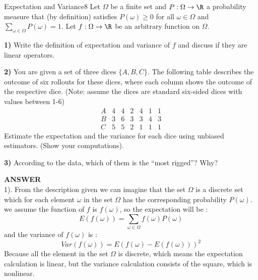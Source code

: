 \newif\ifvimbug
\vimbugfalse

\ifvimbug

\fi

 

\begin{questions}


\begin{question}{Expectation and Variance}{8}
Let $\Omega$ be a finite set and $P:\Omega\rightarrow\R$ a probability measure that (by definition) satisfies $P(\omega)\geq0$ for all $\omega\in\Omega$ and $\sum_{\omega\in\Omega}P(\omega)=1$. 
Let $f:\Omega\rightarrow\R$ be an arbitrary function on $\Omega$.

\textbf{1)} Write the definition of expectation and variance of $f$ and discuss if they are linear operators.

\textbf{2)} You are given a set of three dices $\{A,B,C\}$.
The following table describes the outcome of six rollouts for these dices, where each column shows the outcome of the respective dice. 
(Note: assume the dices are standard six-sided dices with values between 1-6)
\begin{equation*}
\begin{array}{r|cccccc}
    A & 4 & 4 & 2 & 4 & 1 & 1 \\
    \hline
    B & 3 & 6 & 3 & 3 & 4 & 3 \\
    \hline
    C & 5 & 5 & 2 & 1 & 1 & 1 
\end{array}
\end{equation*}
Estimate the expectation and the variance for each dice using unbiased estimators. (Show your computations).

\textbf{3)} According to the data, which of them is the ``most rigged''? Why?

\begin{answer}
\textbf{ANSWER}\\

1). 
From the description given we can imagine that the set $\Omega$ is a discrete set which for each element $\omega$ in the set $\Omega$ has the corresponding probability $P(\omega)$. we assume the function of $f$ is $f(\omega)$, so the expectation will be :
$$E(f(\omega)) = \sum_{\omega \in \Omega}f(\omega)P(\omega)$$
and the variance of $f(\omega)$ is :
$$Var(f(\omega)) = E(f(\omega)- E(f(\omega)))^2$$
Because all the element in the set $\Omega$ is discrete, which means the expectation calculation is linear, but the variance calculation consists of the square, which is nonlinear.


\end{answer}
\end{question}
\end{questions}

